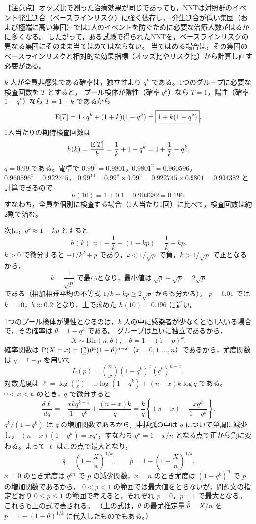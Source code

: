 \documentclass[a4paper,11pt]{ltjsarticle}
\begin{document}
【注意点】オッズ比で測った治療効果が同じであっても，NNTは対照群のイベント発生割合（ベースラインリスク）に強く依存し，
発生割合が低い集団（および極端に高い集団）では1人のイベントを防ぐために必要な治療人数がはるかに多くなる。
したがって，ある試験で得られたNNTを，ベースラインリスクの異なる集団にそのまま当てはめてはならない。
当てはめる場合は，その集団のベースラインリスクと相対的な効果指標（オッズ比やリスク比）から計算し直す必要がある。
\newpage

$k$ 人が全員非感染である確率は，独立性より $q^k$ である。1つのグループに必要な検査回数を $T$ とすると，
プール検体が陰性（確率 $q^k$）なら $T=1$，陽性（確率 $1-q^k$）なら $T=1+k$ であるから
\[
\operatorname{E}[T]=1\cdot q^k+(1+k)(1-q^k)=\boxed{1+k(1-q^k)}.
\]
1人当たりの期待検査回数は
\[
h(k)=\frac{\operatorname{E}[T]}{k}=\frac1k+1-q^k=1+\frac1k-q^k .
\]

$q=0.99$ である。電卓で $0.99^2=0.9801$，$0.9801^2=0.960596$，$0.960596^2=0.922745$，
$0.99^{10}=0.99^8\times0.99^2=0.922745\times0.9801=0.904382$ と計算できるので
\[
h(10)=1+0.1-0.904382=\boxed{0.196}.
\]
すなわち，全員を個別に検査する場合（1人当たり1回）に比べて，検査回数は約2割で済む。

次に，$q^k\approx1-kp$ とすると
\[
h(k)\approx1+\frac1k-(1-kp)=\frac1k+kp .
\]
$k>0$ で微分すると $-1/k^2+p$ であり，$k<1/\sqrt p$ で負，$k>1/\sqrt p$ で正となるから，
\[
k=\boxed{\frac{1}{\sqrt p}}\ \text{で最小となり，最小値は}\ \sqrt p+\sqrt p=\boxed{2\sqrt p}
\]
である（相加相乗平均の不等式 $1/k+kp\ge2\sqrt p$ からも分かる）。
$p=0.01$ では $k=10$，$h\approx0.2$ となり，上で求めた $h(10)=0.196$ に近い。

1つのプール検体が陽性となるのは，$k$ 人の中に感染者が少なくとも1人いる場合で，その確率は $\theta=1-q^k$ である。
グループは互いに独立であるから，
\[
X\sim\boxed{\mathrm{Bin}(n,\theta),\quad\theta=1-(1-p)^k}.
\]
確率関数は $\operatorname{P}(X=x)=\binom nx\theta^x(1-\theta)^{n-x}$（$x=0,1,\ldots,n$）であるから，尤度関数は $q=1-p$ を用いて
\[
L(p)=\binom nx(1-q^k)^x(q^k)^{n-x},
\]
対数尤度は $\ell=\log\binom nx+x\log(1-q^k)+(n-x)k\log q$ である。$0<x<n$ のとき，$q$ で微分すると
\[
\frac{d\ell}{dq}=-\frac{xkq^{k-1}}{1-q^k}+\frac{(n-x)k}{q}=\frac kq\left\{(n-x)-\frac{xq^k}{1-q^k}\right\}.
\]
$q^k/(1-q^k)$ は $q$ の増加関数であるから，中括弧の中は $q$ について単調に減少し，
$(n-x)(1-q^k)=xq^k$，すなわち $q^k=1-x/n$ となる点で正から負に変わる。よって $\ell$ はこの点で最大となり，
\[
\hat q=\left(1-\frac Xn\right)^{1/k},\qquad \boxed{\hat p=1-\left(1-\frac Xn\right)^{1/k}}.
\]
$x=0$ のとき尤度は $q^{kn}$ で $p$ の減少関数，$x=n$ のとき尤度は $(1-q^k)^n$ で $p$ の増加関数であるから，
$0<p<1$ の範囲では最大値をとらないが，問題文の指定どおり $0\le p\le1$ の範囲で考えると，それぞれ $p=0$，$p=1$ で最大となる。
これらも上の式で表される。
（上の式は，$\theta$ の最尤推定量 $\hat\theta=X/n$ を $p=1-(1-\theta)^{1/k}$ に代入したものでもある。）
\end{document}
